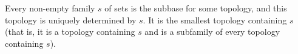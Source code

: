 Every non-empty family $s$ of sets is the subbase for some topology, and this topology is uniquely determined by $s$. It is the smallest topology containing $s$ (that is, it is a topology containing $s$ and is a subfamily of every topology containing $s$).
